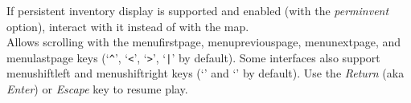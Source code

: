 \documentclass[titlepage]{article}
\begin{document}
\begin{description}[font=\mdseries\ttfamily]
\item[|]
If persistent inventory display is supported and enabled (with the
\textit{perm\textunderscore invent}
option), interact with it instead of with the map.
\\
Allows scrolling with the
menu\textunderscore first\textunderscore page, menu\textunderscore previous\textunderscore page,
menu\textunderscore next\textunderscore page, and menu\textunderscore last\textunderscore page
keys (`\texttt{\textasciicircum}', `\texttt{<}', `\texttt{>}', `\texttt{|}' by default).
Some interfaces also support menu\textunderscore shift\textunderscore left and menu\textunderscore shift\textunderscore right
keys (`\texttt{\textbraceleft}' and `\texttt{\textbraceright}' by default).
Use the \textit{Return} (aka \textit{Enter}) or \textit{Escape} key to
resume play.


\end{description}
\end{document}
